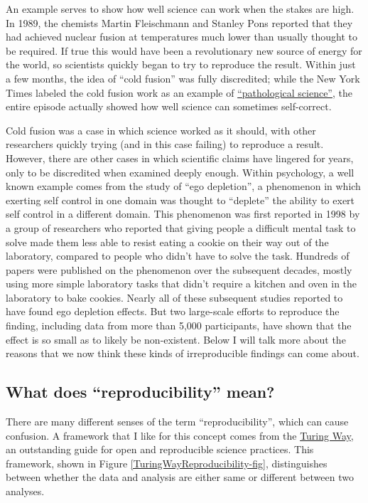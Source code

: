 An example serves to show how well science can work when the stakes are high.
In 1989, the chemists Martin Fleischmann and Stanley Pons reported that they had achieved nuclear fusion at temperatures much lower than usually thought to be required.
If true this would have been a revolutionary new source of energy for the world, so scientists quickly began to try to reproduce the result.
Within just a few months, the idea of ``cold fusion'' was fully discredited; while the New York Times labeled the cold fusion work as an example of \href{https://www.nytimes.com/1989/09/24/magazine/cold-fusion-confusion.html}{``pathological science''}, the entire episode actually showed how well science can sometimes self-correct.

Cold fusion was a case in which science worked as it should, with other researchers quickly trying (and in this case failing) to reproduce a result.
However, there are other cases in which scientific claims have lingered for years, only to be discredited when examined deeply enough.
Within psychology, a well known example comes from the study of ``ego depletion'', a phenomenon in which exerting self control in one domain was thought to ``deplete'' the ability to exert self control in a different domain.
This phenomenon was first reported in 1998 by a group of researchers who reported that giving people a difficult mental task to solve made them less able to resist eating a cookie on their way out of the laboratory, compared to people who didn't have to solve the task.
Hundreds of papers were published on the phenomenon over the subsequent decades, mostly using more simple laboratory tasks that didn't require a kitchen and oven in the laboratory to bake cookies.
Nearly all of these subsequent studies reported to have found ego depletion effects.
But two large-scale efforts to reproduce the finding, including data from more than 5,000 participants, have shown that the effect is so small as to likely be non-existent.
Below I will talk more about the reasons that we now think these kinds of irreproducible findings can come about.

\subsection{What does ``reproducibility'' mean?}

There are many different senses of the term ``reproducibility'', which can cause confusion.
A framework that I like for this concept comes from the \href{https://book.the-turing-way.org/}{Turing Way}, an outstanding guide for open and reproducible science practices.
This framework, shown in Figure \ref{TuringWayReproducibility-fig}, distinguishes between whether the data and analysis are either same or different between two analyses.

